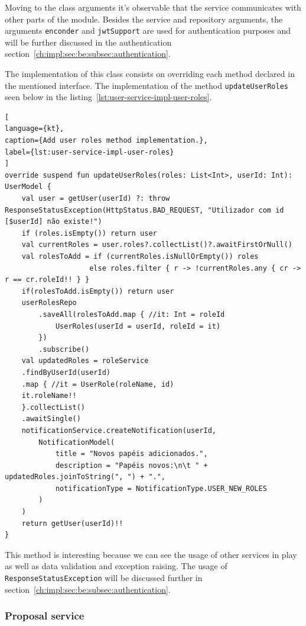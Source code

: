 Moving to the class arguments it's observable that the service communicates with other parts of the module. Besides the service and repository arguments, the arguments \lstinline{enconder} and \lstinline{jwtSupport} are used for authentication purposes and will be further discussed in the authentication section~\ref{ch:impl:sec:be:subsec:authentication}.


The implementation of this class consists on overriding each method declared in the mentioned interface. 
The implementation of the method \lstinline{updateUserRoles} seen below in the listing~\ref{lst:user-service-impl-user-roles}.

\begin{lstlisting}[
language={kt},
caption={Add user roles method implementation.},
label={lst:user-service-impl-user-roles}
]
override suspend fun updateUserRoles(roles: List<Int>, userId: Int): UserModel {
    val user = getUser(userId) ?: throw ResponseStatusException(HttpStatus.BAD_REQUEST, "Utilizador com id [$userId] não existe!")
    if (roles.isEmpty()) return user
    val currentRoles = user.roles?.collectList()?.awaitFirstOrNull()
    val rolesToAdd = if (currentRoles.isNullOrEmpty()) roles
                    else roles.filter { r -> !currentRoles.any { cr -> r == cr.roleId!! } }
    if(rolesToAdd.isEmpty()) return user
    userRolesRepo
        .saveAll(rolesToAdd.map { //it: Int = roleId
            UserRoles(userId = userId, roleId = it) 
        })
        .subscribe()
    val updatedRoles = roleService
    .findByUserId(userId)
    .map { //it = UserRole(roleName, id)
    it.roleName!! 
    }.collectList()
    .awaitSingle()
    notificationService.createNotification(userId,
        NotificationModel(
            title = "Novos papéis adicionados.",
            description = "Papéis novos:\n\t " + updatedRoles.joinToString(", ") + ".",
            notificationType = NotificationType.USER_NEW_ROLES
        )
    )
    return getUser(userId)!!
}
\end{lstlisting}

This method is interesting because we can see the usage of other services in play as well as data validation and exception raising. The usage of \lstinline{ResponseStatusException} will be discussed further in section~\ref{ch:impl:sec:be:subsec:authentication}.

\subsubsection{Proposal service}

